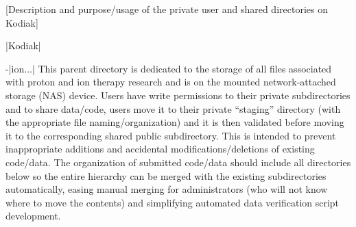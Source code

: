 [Description and purpose/usage of the private user and shared directories on Kodiak]
\begin{tcbenvironment}|Kodiak|
\begin{tcbparbox}-|\dirsep ion\dirsep$\dots$|%
This parent directory is dedicated to the storage of all files associated with proton and ion therapy research and is on the mounted network-attached storage (NAS) device.  Users have write permissions to their private subdirectories and to share data/code, users move it to their private ``staging'' directory (with the appropriate file naming/organization) and it is then validated before moving it to the corresponding shared public subdirectory.  This is intended to prevent inappropriate additions and accidental modifications/deletions of existing code/data.  The organization of submitted code/data should include all directories below  so the entire hierarchy can be merged with the existing subdirectories automatically, easing manual merging for administrators (who will not know where to move the contents) and simplifying automated data verification script development.  


\end{tcbparbox}
\end{tcbenvironment}
